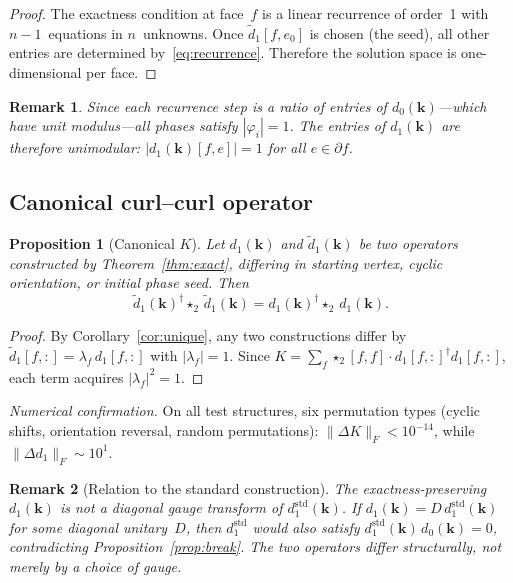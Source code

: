 \documentclass[preprint,12pt]{elsarticle}
\newtheorem{proposition}{Proposition}
\newtheorem{remark}{Remark}
\begin{document}
\begin{proof}
The exactness condition at face~$f$ is a linear recurrence of order~1 with $n-1$~equations in $n$~unknowns. Once $\tilde{d}_1[f, e_0]$ is chosen (the seed), all other entries are determined by~\eqref{eq:recurrence}. Therefore the solution space is one-dimensional per face.
\end{proof}

\begin{remark}
Since each recurrence step is a ratio of entries of $d_0(\mathbf{k})$---which have unit modulus---all phases satisfy $|\varphi_i| = 1$. The entries of $d_1(\mathbf{k})$ are therefore unimodular: $|d_1(\mathbf{k})[f,e]| = 1$ for all $e \in \partial f$.
\end{remark}

\subsection{Canonical curl--curl operator}

\begin{proposition}[Canonical $K$]\label{prop:canonical}
Let $d_1(\mathbf{k})$ and $\tilde{d}_1(\mathbf{k})$ be two operators constructed by Theorem~\ref{thm:exact}, differing in starting vertex, cyclic orientation, or initial phase seed. Then
\begin{equation}
  \tilde{d}_1(\mathbf{k})^\dagger \star_2\, \tilde{d}_1(\mathbf{k}) = d_1(\mathbf{k})^\dagger \star_2\, d_1(\mathbf{k}).
\end{equation}
\end{proposition}

\begin{proof}
By Corollary~\ref{cor:unique}, any two constructions differ by $\tilde{d}_1[f,:] = \lambda_f\,d_1[f,:]$ with $|\lambda_f| = 1$. Since $K = \sum_f \star_2[f,f]\cdot d_1[f,:]^\dagger d_1[f,:]$, each term acquires $|\lambda_f|^2 = 1$.
\end{proof}

\emph{Numerical confirmation.} On all test structures, six permutation types (cyclic shifts, orientation reversal, random permutations): $\|\Delta K\|_F < 10^{-14}$, while $\|\Delta d_1\|_F \sim 10^{1}$.

\begin{remark}[Relation to the standard construction]
The exactness-preserving $d_1(\mathbf{k})$ is not a diagonal gauge transform of $d_1^{\mathrm{std}}(\mathbf{k})$. If $d_1(\mathbf{k}) = D\,d_1^{\mathrm{std}}(\mathbf{k})$ for some diagonal unitary~$D$, then $d_1^{\mathrm{std}}$ would also satisfy $d_1^{\mathrm{std}}(\mathbf{k})\,d_0(\mathbf{k}) = 0$, contradicting Proposition~\ref{prop:break}. The two operators differ structurally, not merely by a choice of gauge.
\end{remark}
\end{document}
